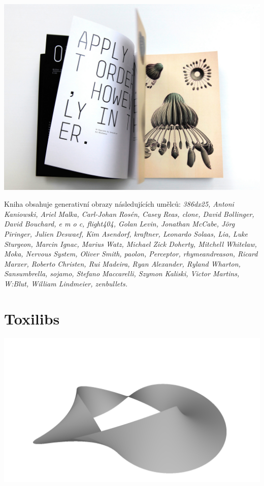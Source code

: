 \documentclass[10pt,twoside=true,open=right,cleardoublepage=empty,chapterprefix=true]{scrbook}
\newcommand{\oddil}[1]{\section{#1}\index{#1}\label{#1}}
\newcommand{\lnb}{\linebreak}
\begin{document}
\begin{centering}
\includegraphics[width = 1\textwidth]{imgs/writtenimages.png}
\end{centering}

Kniha obsahuje generativní obrazy následujících umělců:
{\em 
386dx25, \lnb Antoni Kaniowski, Ariel Malka, Carl-Johan Rosén, Casey Reas, clone, \lnb David Bollinger, David Bouchard, e m o c, flight404, Golan Levin, \lnb Jonathan McCabe, Jörg Piringer, Julien Deswaef, Kim Asendorf, kraftner, Leonardo Solaas, Lia, Luke Sturgeon, Marcin Ignac, Marius Watz, Michael Zick Doherty, Mitchell Whitelaw, Moka, Nervous System, Oliver Smith, \lnb paolon, Perceptor, rhymeandreason, Ricard Marxer, Roberto Christen, Rui Madeira, Ryan Alexander, Ryland Wharton, Sansumbrella, sojamo, \lnb Stefano Maccarelli, Szymon Kaliski, Victor Martins, W:Blut, \lnb William Lindmeier, zenbullets.} 




\newpage
\oddil{Toxilibs}


\begin{center}
\includegraphics[width = 1\textwidth]{imgs/moebius.png}

\end{center}
\end{document}
